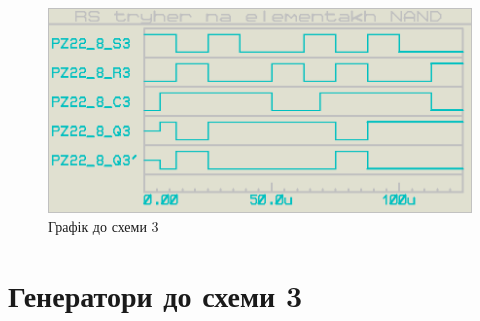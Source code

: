 \documentclass{article}
\begin{document}
\begin{normalsize}
	\begin{figure}[H]
		\centering
		\includegraphics[scale=0.25]{g3}	
		\caption{Графік до схеми 3}
	\end{figure}

	\section*{Генератори до схеми 3}
	\begin{figure}[H]
		\centering
		\hspace{5px}
		

\end{figure}
\end{normalsize}
\end{document}
